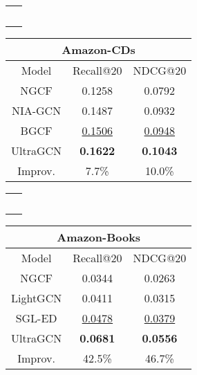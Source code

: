 \documentclass[sigconf,authorversion]{acmart}
\begin{document}
\begin{table}[H]
\begin{tabular}{c}
~\vspace{0ex}
\end{tabular}

\begin{tabular}{ccc}
\hline
\multicolumn{3}{c}{Amazon-CDs}               \\ \hline
Model    & Recall@20       & NDCG@20         \\ \hline
NGCF     & 0.1258          & 0.0792          \\
NIA-GCN  & 0.1487          & 0.0932          \\
BGCF     & \underline{0.1506}          & \underline{0.0948}          \\ \hline
UltraGCN & \textbf{0.1622} & \textbf{0.1043} \\
Improv.  & 7.7\%           & 10.0\%          \\ \hline
\end{tabular}

\begin{tabular}{c}
~\vspace{0ex}
\end{tabular}

\begin{tabular}{ccc}
\hline
\multicolumn{3}{c}{Amazon-Books}               \\ \hline
Model    & Recall@20       & NDCG@20         \\ \hline
NGCF     & 0.0344          & 0.0263          \\
LightGCN  & 0.0411          & 0.0315          \\
SGL-ED     & \underline{0.0478}         & \underline{0.0379}          \\ \hline
UltraGCN & \textbf{0.0681} & \textbf{0.0556} \\
Improv.  & 42.5\%           & 46.7\%          \\ \hline
\end{tabular}


\end{table}







 
\balance



\end{document}
